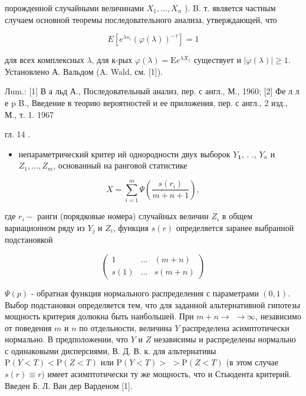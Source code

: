 \documentclass[10pt]{article}
\begin{document}
порожденной случайными величинами $X_{1}, \ldots, X_{n}$ ). B. т. является частным случаем основной теоремы последовательного анализа, утверждающей, что



\[

E\left[e^{\lambda s_{\tau}}(\varphi(\lambda))^{-\tau}\right]=1

\]



для всех комплексных $\lambda$, для к-рых $\varphi(\lambda)=\mathrm{E} e^{\lambda X_{1}}$ существует и $|\varphi(\lambda)| \geqslant 1$. Установлено А. Вальдом (A. Wald, см. [1]).



Лum.: [1] В а льд А., Последовательный анализ, пер. с англ., М., 1960; [2] Фе л л е p B., Введение в теорию вероятностей и ее приложения, пер. с англ., 2 изд., М., т. 1. 1967



гл. 14 .



\begin{itemize}

  \item непараметрический критер ий однородности двух выборок $Y_{\mathbf{1}}$, . ., $Y_{n}$ и $Z_{1}, \ldots, Z_{m}$, основанный на ранговой статистике

\end{itemize}



\[

X=\sum_{i=1}^{m} \Psi\left(\frac{s\left(r_{i}\right)}{m+n+1}\right),

\]



где $r_{i}-$ ранги (порядковые номера) случайных величин $Z_{i}$ в общем вариационном ряду из $Y_{j}$ и $Z_{i}$, функция $s(r)$ определяется заранее выбранной подстановкой



\[

\left(\begin{array}{ccc}

1 & \ldots & (m+n) \\

s(1) & \ldots & s(m+n)

\end{array}\right)

\]



$\Psi(p)$ - обратная функция нормального распределения с параметрами $(0,1)$. Выбор подстановки определяется тем, что для заданной альтернативной гипотезы мощность критерия долюкна быть наибольшей. При $m+n \rightarrow$ $\rightarrow \infty$, независимо от поведения $m$ и $n$ по отдельности, величина $Y$ распределена асимптотически нормально. В предположении, что $Y$ и $Z$ независимы и распределены нормально с одинаковыми дисперсиями, В. Д. В. к. для альтернативы $\mathrm{P}(Y<T)<\mathrm{P}(Z<T)$ или $\mathrm{P}(Y<T)>$ $>\mathrm{P}(Z<T)$ (в этом случае $s(r) \equiv r)$ имеет асимптотически ту же мощность, что и Стьюдента критерий. Введен Б. Л. Ван дер Варденом [1].
\end{document}
